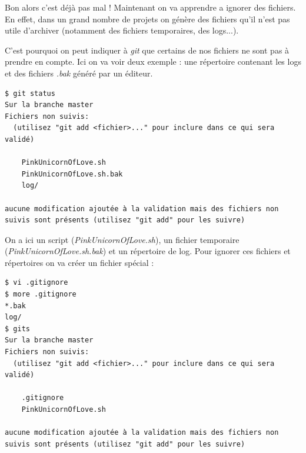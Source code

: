 \documentclass[12pt,a4paper]{article}
\begin{document}
Bon alors c'est déjà pas mal ! Maintenant on va apprendre a ignorer des fichiers. En effet, dans un grand nombre de projets on génère des fichiers qu'il n'est pas utile d'archiver (notamment des fichiers temporaires, des logs...).

C'est pourquoi on peut indiquer à \emph{git} que certains de nos fichiers ne sont pas à prendre en compte. Ici on va voir deux exemple : une répertoire contenant les logs et des fichiers \emph{.bak} généré par un éditeur.

\begin{verbatim}
$ git status
Sur la branche master
Fichiers non suivis:
  (utilisez "git add <fichier>..." pour inclure dans ce qui sera
validé)

	PinkUnicornOfLove.sh
	PinkUnicornOfLove.sh.bak
	log/

aucune modification ajoutée à la validation mais des fichiers non
suivis sont présents (utilisez "git add" pour les suivre)
\end{verbatim}

On a ici un script (\emph{PinkUnicornOfLove.sh}),  un fichier temporaire (\emph{PinkUnicornOfLove.sh.bak}) et un répertoire de log. Pour ignorer ces fichiers et répertoires on va créer un fichier spécial :

\begin{verbatim}
$ vi .gitignore
$ more .gitignore 
*.bak
log/
$ gits
Sur la branche master
Fichiers non suivis:
  (utilisez "git add <fichier>..." pour inclure dans ce qui sera
validé)

	.gitignore
	PinkUnicornOfLove.sh

aucune modification ajoutée à la validation mais des fichiers non
suivis sont présents (utilisez "git add" pour les suivre)
\end{verbatim}
\end{document}

